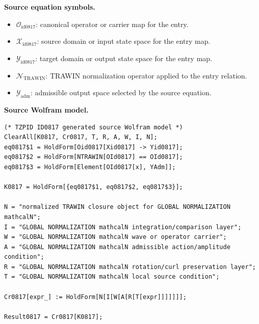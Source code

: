 \begin{minipage}[t]{0.49\linewidth}
\begingroup
\small
\raggedright
\textbf{Source equation symbols.}\par
\begin{itemize}[leftmargin=1.35em,itemsep=1pt,topsep=1pt,parsep=0pt]
    \item $\mathcal{O}_{\mathrm{id0817}}$: canonical operator or carrier map for the entry.
    \item $\mathcal{X}_{\mathrm{id0817}}$: source domain or input state space for the entry map.
    \item $\mathcal{Y}_{\mathrm{id0817}}$: target domain or output state space for the entry map.
    \item $\mathcal{N}_{\mathrm{TRAWIN}}$: TRAWIN normalization operator applied to the entry relation.
    \item $\mathcal{Y}_{\mathrm{adm}}$: admissible output space selected by the source equation.
\end{itemize}
\endgroup
\end{minipage}\hfill
\begin{minipage}[t]{0.47\linewidth}
\begingroup
\scriptsize
\raggedright
\textbf{Source Wolfram model.}\par
\begin{Verbatim}[fontsize=\tiny,breaklines=true,breakanywhere=true]
(* TZPID ID0817 generated source Wolfram model *)
ClearAll[K0817, Cr0817, T, R, A, W, I, N];
eq0817$1 = HoldForm[Oid0817[Xid0817] -> Yid0817];
eq0817$2 = HoldForm[NTRAWIN[OId0817] == OId0817];
eq0817$3 = HoldForm[Element[OId0817[x], YAdm]];

K0817 = HoldForm[{eq0817$1, eq0817$2, eq0817$3}];

N = "normalized TRAWIN closure object for GLOBAL NORMALIZATION mathcalN";
I = "GLOBAL NORMALIZATION mathcalN integration/comparison layer";
W = "GLOBAL NORMALIZATION mathcalN wave or operator carrier";
A = "GLOBAL NORMALIZATION mathcalN admissible action/amplitude condition";
R = "GLOBAL NORMALIZATION mathcalN rotation/curl preservation layer";
T = "GLOBAL NORMALIZATION mathcalN local source condition";

Cr0817[expr_] := HoldForm[N[I[W[A[R[T[expr]]]]]]];

Result0817 = Cr0817[K0817];
\end{Verbatim}
\endgroup
\end{minipage}

